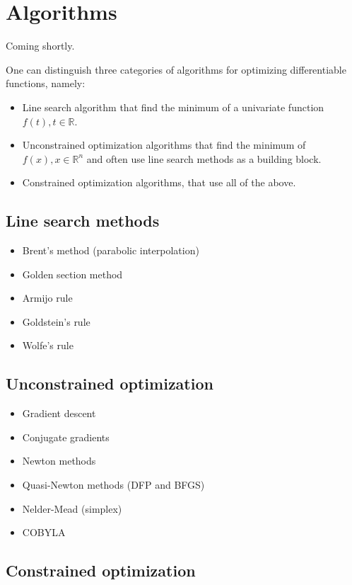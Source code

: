 \documentclass{article}
\begin{document}
\section{Algorithms}

Coming shortly.

One can distinguish three categories of algorithms for optimizing differentiable functions, namely:
\begin{itemize}
\item Line search algorithm that find the minimum of a univariate function $f(t), t\in\mathbb{R}$.
\item Unconstrained optimization algorithms that find the minimum of $f(x), x\in\mathbb{R}^n$ and often use line search methods as a building block.
\item Constrained optimization algorithms, that use all of the above.
\end{itemize}

\subsection{Line search methods}

\begin{itemize}
\item Brent's method (parabolic interpolation)
\item Golden section method
\item Armijo rule
\item Goldstein's rule
\item Wolfe's rule
\end{itemize}

\subsection{Unconstrained optimization}

\begin{itemize}
\item Gradient descent
\item Conjugate gradients
\item Newton methods
\item Quasi-Newton methods (DFP and BFGS)
\item Nelder-Mead (simplex)
\item COBYLA
\end{itemize}

\subsection{Constrained optimization}
\end{document}
